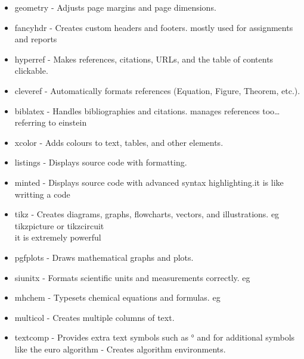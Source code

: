 \documentclass[a4paper,12pt]{article}
\begin{document}
{\begin{itemize}
\item geometry     - Adjusts page margins and page dimensions.\\

\item fancyhdr     - Creates custom headers and footers. mostly used for assignments and reports\\

\item hyperref     - Makes references, citations, URLs, and the table of contents clickable.\\

\item cleveref     - Automatically formats references (Equation, Figure, Theorem, etc.).\\

\item biblatex     - Handles bibliographies and citations. manages references too\ldots referring to einstein\\

\item xcolor       - Adds colours to text, tables, and other elements.\\
\item listings     - Displays source code with formatting.\\

\item minted       - Displays source code with advanced syntax highlighting.it is like writting a code\\

\item tikz         - Creates diagrams, graphs, flowcharts, vectors, and illustrations. eg tikzpicture or tikzcircuit
\\it is extremely powerful\\

\item pgfplots     - Draws mathematical graphs and plots.\\

\item siunitx      - Formats scientific units and measurements correctly. eg 

\item mhchem       - Typesets chemical equations and formulas.
eg 
\item multicol     - Creates multiple columns of text.\\

\item textcomp     - Provides extra text symbols such as ° and \texteuro \textdegree
 for additional symbols like the euro
algorithm    - Creates algorithm environments.


\end{itemize}}
\end{document}
